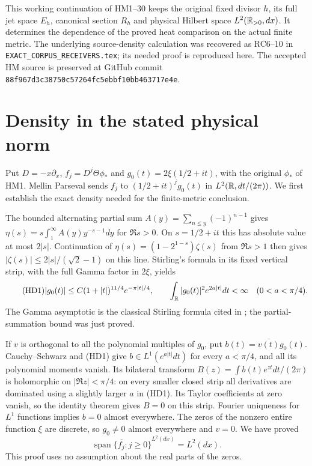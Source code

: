 \documentclass[11pt]{article}
\begin{document}
This working continuation of HM1--30 keeps the original fixed divisor
$h$, its full jet space $E_h$, canonical section $R_h$ and physical
Hilbert space $L^2(\mathbb R_{>0},dx)$. It determines the dependence of the
proved heat comparison on the actual finite metric. The underlying
source-density calculation was recovered as RC6--10 in
\texttt{EXACT\_CORPUS\_RECEIVERS.tex}; its needed proof is reproduced
here. The accepted HM source is preserved at GitHub commit
\texttt{88f967d3c38750c57264fc5ebbf10bb463717e4e}.

\section{Density in the stated physical norm}
Put $D=-x\partial_x$, $f_j=D^j\Theta\phi_*$ and
$g_0(t)=2\xi(1/2+it)$, with the original $\phi_*$ of HM1.
Mellin Parseval sends $f_j$ to $(1/2+it)^jg_0(t)$ in
$L^2(\mathbb R,dt/(2\pi))$. We first establish the exact density needed
for the finite-metric conclusion.

The bounded alternating partial sum
$A(y)=\sum_{n\le y}(-1)^{n-1}$ gives
$\eta(s)=s\int_1^\infty A(y)y^{-s-1}dy$ for $\Re s>0$.
On $s=1/2+it$ this has absolute value at most $2|s|$.
Continuation of $\eta(s)=(1-2^{1-s})\zeta(s)$ from $\Re s>1$
then gives $|\zeta(s)|\le2|s|/(\sqrt2-1)$ on this line.
Stirling's formula in its fixed vertical strip, with the full Gamma
factor in $2\xi$, yields
\begin{equation}\tag{HD1}
 |g_0(t)|\le C(1+|t|)^{11/4}e^{-\pi|t|/4},\qquad
 \int_\mathbb R |g_0(t)|^2e^{2a|t|}dt<\infty\quad(0<a<\pi/4).
\end{equation}
The Gamma asymptotic is the classical Stirling formula cited in
\cite{hd:gamma}; the partial-summation bound was just proved.

If $v$ is orthogonal to all the polynomial multiples of $g_0$, put
$b(t)=\overline{v(t)}g_0(t)$. Cauchy--Schwarz and (HD1) give
$b\in L^1(e^{a|t|}dt)$ for every $a<\pi/4$, and all its polynomial
moments vanish. Its bilateral transform
$B(z)=\int b(t)e^{zt}dt/(2\pi)$ is holomorphic on $|\Re z|<\pi/4$:
on every smaller closed strip all derivatives are dominated using a
slightly larger $a$ in (HD1). Its Taylor coefficients at zero vanish,
so the identity theorem gives $B=0$ on this strip. Fourier uniqueness
for $L^1$ functions \cite{hd:Fourier} implies $b=0$ almost everywhere.
The zeros of the nonzero entire function $\xi$ are discrete, so
$g_0\ne0$ almost everywhere and $v=0$. We have proved
\begin{equation}\tag{HD2}
 \overline{\operatorname{span}\{f_j:j\ge0\}}^{L^2(dx)}=L^2(dx).
\end{equation}
This proof uses no assumption about the real parts of the zeros.
\end{document}
